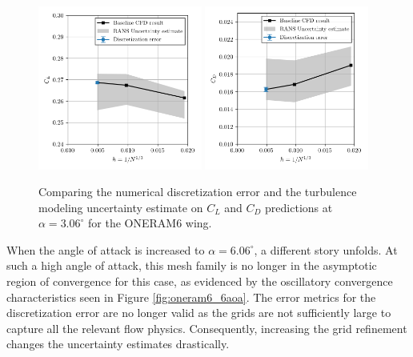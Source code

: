 \begin{figure}
\center
\subfigure%
  {\includegraphics[width=0.48\textwidth]{code/image_gen/oneram6/images/CL_03aoa.png}}
\subfigure%
  {\includegraphics[width=0.48\textwidth]{code/image_gen/oneram6/images/CD_03aoa.png}}
\caption{Comparing the numerical discretization error and the turbulence modeling uncertainty estimate on $C_L$ and $C_D$ predictions at $\alpha = 3.06^\circ$ for the ONERAM6 wing.}\label{fig:oneram6_3aoa}
\end{figure}

When the angle of attack is increased to $\alpha = 6.06^\circ$, a different story unfolds. 
At such a high angle of attack, this mesh family is no longer in the asymptotic region of convergence for this case, as evidenced by the oscillatory convergence characteristics seen in Figure \ref{fig:oneram6_6aoa}.
The error metrics for the discretization error are no longer valid as the grids are not sufficiently large to capture all the relevant flow physics. 
Consequently, increasing the grid refinement changes the uncertainty estimates drastically. 

